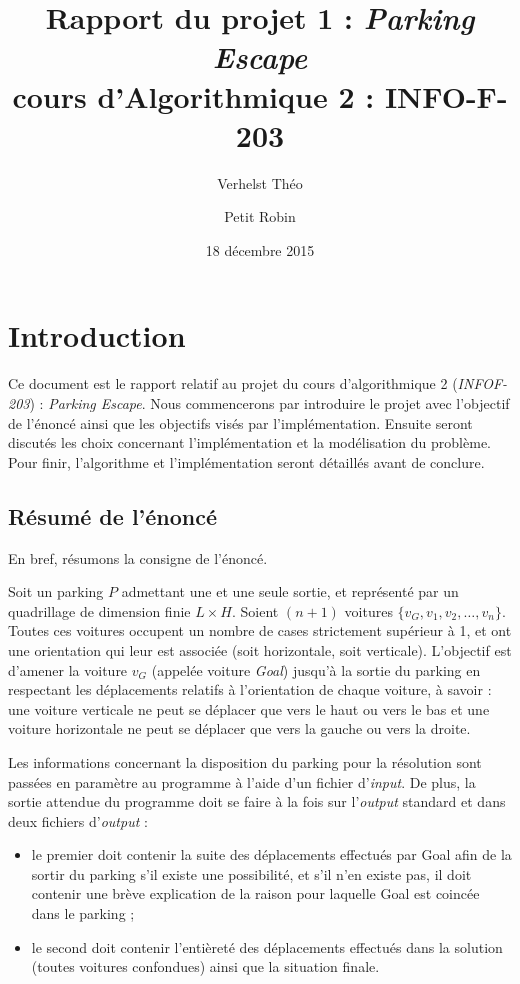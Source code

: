 \documentclass{article}
\title{Rapport du projet 1 : \textit{Parking Escape}\\cours d'Algorithmique 2 : INFO-F-203}
\author{Verhelst Théo \and Petit Robin}
\date{18 décembre 2015}
\begin{document}
\maketitle
\tableofcontents
\newpage
{}

\section{Introduction}
    Ce document est le rapport relatif au projet du cours d'algorithmique 2 (\textit{INFOF-203}) : \textit{Parking Escape}. Nous commencerons par
    introduire le projet avec l'objectif de l'énoncé ainsi que les objectifs visés par l'implémentation. Ensuite seront discutés les choix concernant
    l'implémentation et la modélisation du problème. Pour finir, l'algorithme et l'implémentation seront détaillés avant de conclure.

    \subsection{Résumé de l'énoncé}
        En bref, résumons la consigne de l'énoncé.

        Soit un parking $P$ admettant une et une seule sortie, et représenté par un quadrillage de dimension finie $L\times H$. Soient $(n+1)$ voitures
        $\{v_G, v_1, v_2, \ldots, v_n\}$. Toutes ces voitures occupent un nombre de cases strictement supérieur à 1, et ont une
        orientation qui leur est associée (soit horizontale, soit verticale). L'objectif est d'amener la voiture $v_G$ (appelée voiture \textit{Goal})
        jusqu'à la sortie du parking en respectant les déplacements relatifs à l'orientation de chaque voiture, à savoir : une voiture verticale ne peut
        se déplacer que vers le haut ou vers le bas et une voiture horizontale ne peut se déplacer que vers la gauche ou vers la droite.

        Les informations concernant la disposition du parking pour la résolution sont passées en paramètre au programme à l'aide d'un fichier d'\textit{input}.
        De plus, la sortie attendue du programme doit se faire à la fois sur l'\textit{output} standard et dans deux fichiers d'\textit{output} :

        \begin{itemize}
            \item le premier doit contenir la suite des déplacements effectués par Goal afin de la sortir du parking
                  s'il existe une possibilité, et s'il n'en existe pas, il doit contenir une brève explication de la raison pour
                  laquelle Goal est coincée dans le parking ;
            \item le second doit contenir l'entièreté des déplacements effectués dans la solution (toutes voitures confondues)
                  ainsi que la situation finale.
        \end{itemize}
\end{document}

